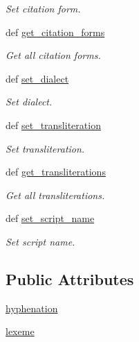 \begin{DoxyCompactItemize}
\begin{DoxyCompactList}\small\item\em Set citation form. \end{DoxyCompactList}\item 
def \hyperlink{classlmf_1_1src_1_1morphology_1_1lemma_1_1_lemma_a0d14b66ae5d6f0fd8a9aba74520b88a0}{get\+\_\+citation\+\_\+forms}
\begin{DoxyCompactList}\small\item\em Get all citation forms. \end{DoxyCompactList}\item 
def \hyperlink{classlmf_1_1src_1_1morphology_1_1lemma_1_1_lemma_aa22e9424fc9f35cea9eb1a0a47b3a420}{set\+\_\+dialect}
\begin{DoxyCompactList}\small\item\em Set dialect. \end{DoxyCompactList}\item 
def \hyperlink{classlmf_1_1src_1_1morphology_1_1lemma_1_1_lemma_aa7fbf68d0e986a478493cbf450ae8357}{set\+\_\+transliteration}
\begin{DoxyCompactList}\small\item\em Set transliteration. \end{DoxyCompactList}\item 
def \hyperlink{classlmf_1_1src_1_1morphology_1_1lemma_1_1_lemma_a3e9430de1e0739171a6f655893863708}{get\+\_\+transliterations}
\begin{DoxyCompactList}\small\item\em Get all transliterations. \end{DoxyCompactList}\item 
def \hyperlink{classlmf_1_1src_1_1morphology_1_1lemma_1_1_lemma_aae4244411f218ebc08fc659b1388d7a0}{set\+\_\+script\+\_\+name}
\begin{DoxyCompactList}\small\item\em Set script name. \end{DoxyCompactList}\end{DoxyCompactItemize}
\subsection*{Public Attributes}
\begin{DoxyCompactItemize}
\item 
\hyperlink{classlmf_1_1src_1_1morphology_1_1lemma_1_1_lemma_a225df7c63b5a3a654307bc2d24ed1937}{hyphenation}
\item 
\hyperlink{classlmf_1_1src_1_1morphology_1_1lemma_1_1_lemma_ab68007ef04c51304b92e3eefcf2f40c9}{lexeme}
\end{DoxyCompactItemize}


